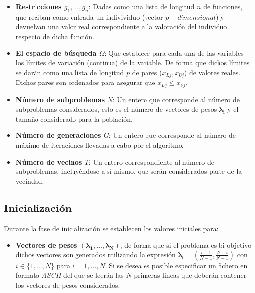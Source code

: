 \noindent\begin{minipage}[H]{0.5\linewidth}
\begin{itemize}
	\item \textbf{Restricciones $g_1, \dots, g_n$}:  Dadas como una lista de longitud $n$ de funciones, que reciban como entrada un indivividuo (vector $p-dimensional$) y devuelvan una valor real correspondiente a la valoración del individuo respecto de dicha función.\\
	
    \item \textbf{El espacio de búsqueda $\Omega$}: Que establece para cada una de las variables los límites de variación (continua) de la variable. De forma que dichos límites se darán como una lista de longitud $p$ de pares ($x_{Lj}, x_{Uj}$) de valores reales. Dichos pares son ordenados para asegurar que $x_{Lj} \leq x_{Uj}$.\\
     
     \item \textbf{Número de subproblemas $N$}: Un entero que corresponde al número de subproblemas considerados, esto es el número de vectores de pesos $\boldsymbol{\lambda_i}$ y el tamaño considerado para la población.\\
     
     \item \textbf{Número de generaciones $G$}:  Un entero que corresponde al número de máximo de iteraciones llevadas a cabo por el algoritmo.\\
    
    \item \textbf{Número de vecinos $T$}: Un entero correspondiente al número de subproblemas, incluyéndose a sí mismo, que serán considerados parte de la vecindad.\\
    
\end{itemize} 


\subsection{Inicialización}

Durante la fase de inicialización se establecen los valores iniciales para:\\

\begin{itemize}
\item\textbf{ Vectores de pesos $(\boldsymbol{\lambda_1}, \dots, \boldsymbol{\lambda_N})$}, de forma que si el problema es bi-objetivo dichos vectores son generados utilizando la expresión $\boldsymbol{\lambda_i} = \left(\frac{i-1}{N-1}, \frac{N-i}{N-1} \right)$ con $i \in \{1, \dots, N\}$ para $i=1,\dots, N$. Si se desea es posible especificar un fichero en formato \textit{ASCII} del que se leerán las $N$ primeras lineas que deberán contener los vectores de pesos considerados.\\

\end{itemize}

\end{minipage} \hfill
